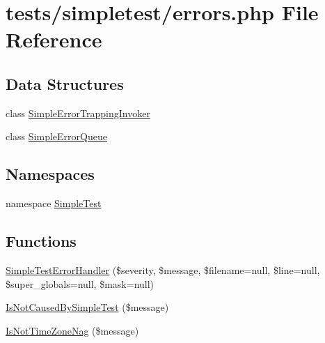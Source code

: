 \hypertarget{errors_8php}{\section{tests/simpletest/errors.php File Reference}
\label{errors_8php}
}
\subsection*{Data Structures}
\begin{DoxyCompactItemize}
\item 
class \hyperlink{class_simple_error_trapping_invoker}{Simple\-Error\-Trapping\-Invoker}
\item 
class \hyperlink{class_simple_error_queue}{Simple\-Error\-Queue}
\end{DoxyCompactItemize}
\subsection*{Namespaces}
\begin{DoxyCompactItemize}
\item 
namespace \hyperlink{namespace_simple_test}{Simple\-Test}
\end{DoxyCompactItemize}
\subsection*{Functions}
\begin{DoxyCompactItemize}
\item 
\hyperlink{errors_8php_a58d28a96baef5def3eafc2513a98ab2d}{Simple\-Test\-Error\-Handler} (\$severity, \$message, \$filename=null, \$line=null, \$super\-\_\-globals=null, \$mask=null)
\item 
\hyperlink{errors_8php_a012af8db52e47aabc046cd6fdbb2ac13}{Is\-Not\-Caused\-By\-Simple\-Test} (\$message)
\item 
\hyperlink{errors_8php_ac0ff044ea1ecf535cfcc339153238cfe}{Is\-Not\-Time\-Zone\-Nag} (\$message)
\end{DoxyCompactItemize}


